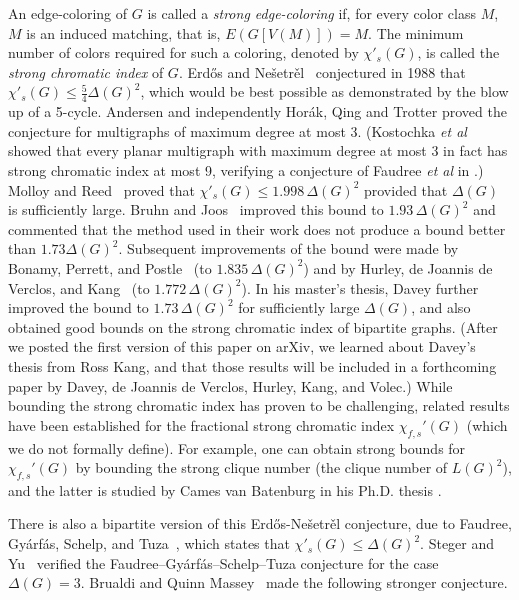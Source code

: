 \documentclass[11pt]{amsart}
\begin{document}
An edge-coloring of \( G \) is called a {\it strong edge-coloring} if, for every color class $M$, $M$ is an induced matching, that is, $E(G[V(M)]) = M$. The minimum number of colors required for such a coloring, denoted by \( \chi'_s(G) \), is called the {\it strong chromatic index} of \( G \).  Erd\H{o}s and Ne\v{s}etr\v{e}l~\cite{Erdos_Nesetril_1988}  conjectured in 1988 that
\(
\chi'_s(G) \le \tfrac{5}{4}\Delta(G)^2\), which would be best possible as demonstrated by the blow up of a 5-cycle.
 Andersen \cite{Andersen92} and independently Hor\'{a}k, Qing and Trotter \cite{HQT93} proved the conjecture for multigraphs of maximum degree at most 3.  
 (Kostochka {\it et al} \cite{KLRSWY16} showed that every planar multigraph with maximum degree at most 3 in fact has strong chromatic index at most 9, verifying a conjecture of Faudree {\it et al} in  \cite{FaudreeGyarfasSchelpTuza1990StrongChromaticIndex}.)
Molloy and Reed~\cite{MolloyReed1997} proved that \( \chi'_s(G) \le 1.998\,\Delta(G)^2 \) provided that $\Delta(G)$ is sufficiently large. Bruhn and Joos~\cite{BruhnJoos2018StrongerBoundStrongChromaticIndex} improved this bound to \( 1.93\,\Delta(G)^2 \) and commented that the method used in their work does not produce a bound better than $1.73\Delta(G)^2$. Subsequent improvements of the bound were made by Bonamy, Perrett, and Postle~\cite{BonamyPerrettPostle2022SparseNeighbourhoods} (to \( 1.835\,\Delta(G)^2 \))  and by Hurley, de Joannis de Verclos, and Kang~\cite{HurleyJoannisKang2022ImprovedProcedure} (to  \( 1.772\,\Delta(G)^2 \)). In his master's thesis, Davey \cite{davey2024local} further improved the bound to  \( 1.73\,\Delta(G)^2 \) for sufficiently large $\Delta(G)$, and also obtained good bounds on the strong chromatic index of bipartite graphs. (After we posted the first version of this paper on arXiv, we learned about Davey's thesis from Ross Kang, and that those results will be included  in a forthcoming paper by Davey, de Joannis de Verclos, Hurley, Kang, and Volec.) While bounding the strong chromatic index has proven to be challenging, related results have been established for the fractional strong chromatic index $\chi_{f,s}'(G)$ (which we do not formally define). For example, one can obtain strong bounds for $\chi_{f,s}'(G)$ by bounding the strong clique number (the clique number of $L(G)^2$), and the latter is studied by Cames van Batenburg in his Ph.D. thesis \cite{vanBatenurgThesis}. 


There is also a bipartite version of this Erd\H{o}s-Ne\v{s}etr\v{e}l conjecture, due to Faudree, Gy\'arf\'as, Schelp, and Tuza~\cite{FaudreeGyarfasSchelpTuza1990StrongChromaticIndex},  which states that \( \chi'_s(G) \le \Delta(G)^2 \). 
Steger and Yu~\cite{StegerYu1993InducedMatchings} verified the Faudree--Gy\'arf\'as--Schelp--Tuza conjecture for the case $\Delta (G)=3$. 
Brualdi and Quinn Massey~\cite{BrualdiQuinnMassey1993} made the following stronger conjecture.
 
\end{document}
